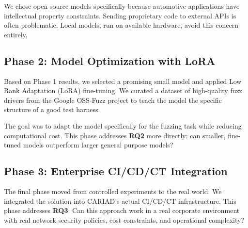 We chose open-source models specifically because automotive applications have intellectual property constraints. Sending proprietary code to external APIs is often problematic. Local models, run on available hardware, avoid this concern entirely.

\subsection{Phase 2: Model Optimization with LoRA}
Based on Phase 1 results, we selected a promising small model and applied Low Rank Adaptation (LoRA) fine-tuning. We curated a dataset of high-quality fuzz drivers from the Google OSS-Fuzz project to teach the model the specific structure of a good test harness.

The goal was to adapt the model specifically for the fuzzing task while reducing computational cost. This phase addresses \textbf{RQ2} more directly: can smaller, fine-tuned models outperform larger general purpose models?

\subsection{Phase 3: Enterprise CI/CD/CT Integration}
The final phase moved from controlled experiments to the real world. We integrated the solution into CARIAD's actual CI/CD/CT infrastructure. This phase addresses \textbf{RQ3}: Can this approach work in a real corporate environment with real network security policies, cost constraints, and operational complexity?

